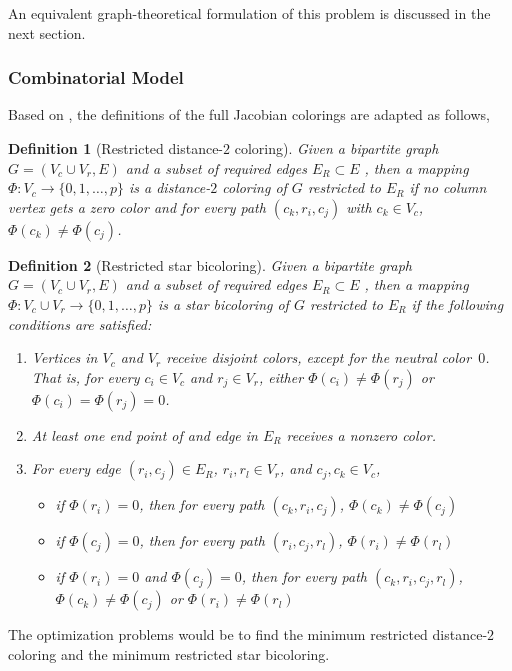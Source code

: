 \documentclass[12pt, twoside]{book}
\newtheorem{definition}{Definition}
\begin{document}
An equivalent graph-theoretical formulation of this problem is discussed in the next
section.

\subsubsection{Combinatorial Model}
Based on \cite{Gebremedhin05whatcolor,Lulfesmann2012Fap}, the definitions
of the full Jacobian colorings are adapted as follows,
\begin{definition}[Restricted distance-$2$ coloring]\label{d.coloring.d2}
Given a bipartite graph $G=(V_c\cup V_r, E)$ and a subset of required edges
$E_R\subset E$ , then a mapping $\Phi:V_c \to
\{0,1,\dots ,p\}$ is a distance-$2$ coloring
of $G$ restricted to $E_R$ if no column vertex gets a zero color and
for every path $(c_k,r_i,c_j)$ with $c_k\in V_c$,
$\Phi(c_k) \neq \Phi(c_j)$.
\end{definition}
\begin{definition}[Restricted star bicoloring]\label{d.coloring.bicol}
Given a bipartite graph $G=(V_c\cup V_r, E)$ and a subset of required edges
$E_R\subset E$ , then a mapping $\Phi:V_c \cup V_r \to
\{0,1,\dots ,p\}$ is a star bicoloring of $G$ restricted to $E_R$
if the following conditions are satisfied:
\begin{enumerate}
\item Vertices in $V_c$ and $V_r$ receive disjoint colors, except for the neutral color~$0$. That
is, for every $c_i \in V_c$ and $r_j \in V_r$, either $\Phi(c_i) \neq \Phi(r_j)$ or
$\Phi(c_i)=\Phi(r_j)=0$.

\item At least one end point of and edge in $E_R$ receives a nonzero color.
\item For every edge $(r_i,c_j)\in E_R$, $r_i, r_l\in V_r$, and
$c_j, c_k\in V_c$,
\begin{itemize}
\item if $\Phi (r_i) = 0$, then for every path $(c_k,r_i,c_j)$, $\Phi (c_k)\neq \Phi (c_j)$
\item if $\Phi (c_j) = 0$, then for every path $(r_i,c_j,r_l)$, $\Phi (r_i)\neq \Phi (r_l)$
\item if $\Phi (r_i) = 0$ and $\Phi (c_j) = 0$, then for every path $(c_k,r_i,c_j,r_l)$,
$\Phi (c_k)\neq \Phi (c_j)$ or $\Phi (r_i)\neq \Phi (r_l)$
\end{itemize}
\end{enumerate}
\end{definition}

The optimization problems would be to
find the minimum restricted distance-$2$ coloring
and the minimum restricted star bicoloring.
\end{document}
